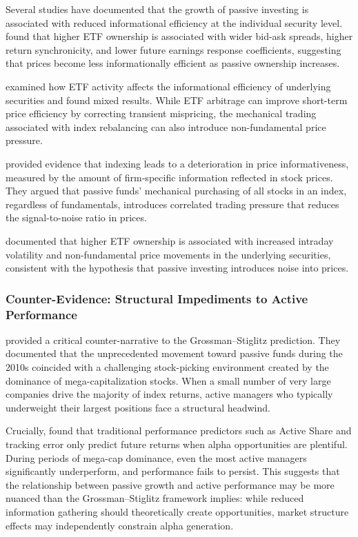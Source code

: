 \documentclass[11pt, a4paper]{article}
\begin{document}
Several studies have documented that the growth of passive investing is associated with reduced informational efficiency at the individual security level. \textcite{israeli2017} found that higher ETF ownership is associated with wider bid-ask spreads, higher return synchronicity, and lower future earnings response coefficients, suggesting that prices become less informationally efficient as passive ownership increases.

\textcite{glosten2021} examined how ETF activity affects the informational efficiency of underlying securities and found mixed results. While ETF arbitrage can improve short-term price efficiency by correcting transient mispricing, the mechanical trading associated with index rebalancing can also introduce non-fundamental price pressure.

\textcite{qin2015} provided evidence that indexing leads to a deterioration in price informativeness, measured by the amount of firm-specific information reflected in stock prices. They argued that passive funds' mechanical purchasing of all stocks in an index, regardless of fundamentals, introduces correlated trading pressure that reduces the signal-to-noise ratio in prices.

\textcite{ben-david2018} documented that higher ETF ownership is associated with increased intraday volatility and non-fundamental price movements in the underlying securities, consistent with the hypothesis that passive investing introduces noise into prices.

\subsubsection{Counter-Evidence: Structural Impediments to Active Performance}

\textcite{busse2022} provided a critical counter-narrative to the Grossman--Stiglitz prediction. They documented that the unprecedented movement toward passive funds during the 2010s coincided with a challenging stock-picking environment created by the dominance of mega-capitalization stocks. When a small number of very large companies drive the majority of index returns, active managers who typically underweight their largest positions face a structural headwind.

Crucially, \textcite{busse2022} found that traditional performance predictors such as Active Share \parencite{cremers2009} and tracking error only predict future returns when alpha opportunities are plentiful. During periods of mega-cap dominance, even the most active managers significantly underperform, and performance fails to persist. This suggests that the relationship between passive growth and active performance may be more nuanced than the Grossman--Stiglitz framework implies: while reduced information gathering should theoretically create opportunities, market structure effects may independently constrain alpha generation.
\end{document}

